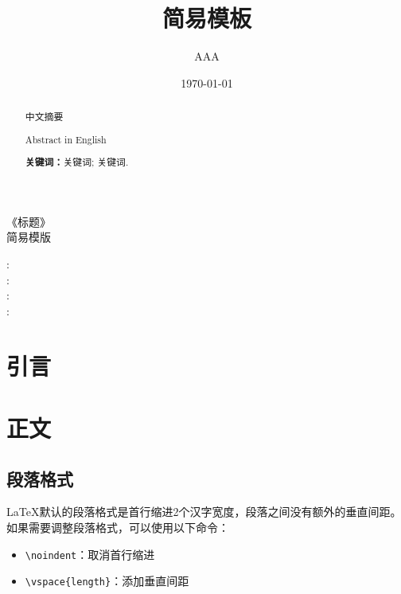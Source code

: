 \documentclass[12pt, a4paper, oneside]{ctexart}
\title{简易模板}
\author{AAA}
\date{\today}
\begin{document}
\pagestyle{empty}
\vspace*{12em}
\begin{center}
{\Huge 《标题》}\\
\bigskip  %
{\Huge 简易模版}
\end{center}
\vspace{12em}  %
\begin{center}
{\Large  
{}:\underline{}\\
:\underline{}\\
:\underline{}\\
:\underline{}\\
}
\end{center}
\clearpage

\setcounter{page}{0}
\thispagestyle{empty}

\begin{abstract}
    中文摘要

    Abstract in English
    \par\textbf{关键词：}关键词; 关键词.
\end{abstract}

\newpage

\setcounter{page}{1}
\tableofcontents
\newpage
\setcounter{page}{1}

\section{引言}
\newpage

\section{正文}
\subsection{段落格式}
LaTeX默认的段落格式是首行缩进2个汉字宽度，段落之间没有额外的垂直间距。如果需要调整段落格式，可以使用以下命令：
\begin{itemize}
    \item \verb|\noindent|：取消首行缩进
    \item \verb|\vspace{length}|：添加垂直间距
\end{itemize}
\end{document}
